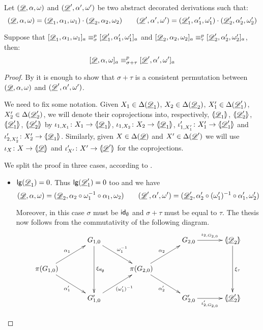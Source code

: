 \begin{lemma}\label{lem:sum} Let $(\underline{\mathscr{D}}, \alpha, \omega)$ and $(\underline{\mathscr{D}}', \alpha', \omega')$ be two abstract decorated derivations such that:
	\[(\underline{\mathscr{D}}, \alpha, \omega)=(\underline{\mathscr{D}}_1, \alpha_1, \omega_1)\cdot (\underline{\mathscr{D}}_2, \alpha_2, \omega_2) \qquad (\underline{\mathscr{D}}', \alpha', \omega')=(\underline{\mathscr{D}}'_1, \alpha'_1, \omega'_1)\cdot (\underline{\mathscr{D}}'_2, \alpha'_2, \omega'_2)\]
	
Suppose that $[\underline{\mathscr{D}}_1, \alpha_1, \omega_1]_a \equiv^p_\sigma [\underline{\mathscr{D}}'_1, \alpha'_1, \omega'_1]_a$ and $[\underline{\mathscr{D}}_2, \alpha_2, \omega_2]_a \equiv^p_\tau [\underline{\mathscr{D}}'_2, \alpha'_2, \omega'_2]_a$, then:
\[[\underline{\mathscr{D}}, \alpha, \omega]_a\equiv^p_{\sigma+\tau} [\underline{\mathscr{D}}', \alpha', \omega']_a\]
\end{lemma}
\begin{proof}
By 	it is enough to show that $\sigma+\tau$	is a consistent permutation between $(\underline{\mathscr{D}}, \alpha, \omega)$ and $(\underline{\mathscr{D}}', \alpha', \omega')$.

We need to fix some notation.	Given $X_1\in \Delta(\underline{\mathscr{D}}_1)$, $X_2\in \Delta(\underline{\mathscr{D}}_2)$, $X'_1\in \Delta(\underline{\mathscr{D}}'_1)$, $X'_2\in \Delta(\underline{\mathscr{D}}'_2)$, we will denote their coprojections into, respectively, $\langle \hspace{-1.85pt}[ \underline{\mathscr{D}}_1]\hspace{-1.85pt}\rangle$, $\langle \hspace{-1.85pt}[ \underline{\mathscr{D}}'_2]\hspace{-1.85pt}\rangle$, $\langle \hspace{-1.85pt}[ \underline{\mathscr{D}}'_1]\hspace{-1.85pt}\rangle$, $\langle \hspace{-1.85pt}[ \underline{\mathscr{D}}'_2]\hspace{-1.85pt}\rangle$ by
	$\iota_{1, X_1}\colon X_1\to \langle \hspace{-1.85pt}[\underline{\mathscr{D}}_1]\hspace{-1.85pt}\rangle$, $\iota_{1, X_2}\colon X_2\to \langle \hspace{-1.85pt}[\underline{\mathscr{D}}_1]\hspace{-1.85pt}\rangle$, $\iota'_{1, X'_1}\colon X'_1\to \langle \hspace{-1.85pt}[\underline{\mathscr{D}}'_1]\hspace{-1.85pt}\rangle$ and $\iota'_{2, X'_2}\colon X'_2\to \langle \hspace{-1.85pt}[\underline{\mathscr{D}}_1]\hspace{-1.85pt}\rangle$. Similarly, given $X\in \Delta(\underline{\mathscr{D}})$ and $X'\in \Delta(\underline{\mathscr{D}}')$ we will use $\iota_X\colon X\to \langle \hspace{-1.85pt}[ \underline{\mathscr{D}}]\hspace{-1.85pt}\rangle$ and $\iota'_{X'}\colon X'\to \langle \hspace{-1.85pt}[ \underline{\mathscr{D}}' ]\hspace{-1.85pt}\rangle$ for the coprojections. 
	
	We split the proof in three cases, according to .
	\begin{itemize}
		\item $\mathsf{lg}(\underline{\mathscr{D}}_1)=0$. Thus $\mathsf{lg}(\underline{\mathscr{D}}'_1)=0$ too  and we have
		\[
		(\underline{\mathscr{D}}, \alpha, \omega)=(\underline{\mathscr{D}}_2, \alpha_2\circ \omega_1^{-1}\circ \alpha_1, \omega_2) \qquad  (\underline{\mathscr{D}}', \alpha', \omega')=(\underline{\mathscr{D}}'_2, \alpha'_2\circ (\omega'_1)^{-1}\circ \alpha'_1, \omega'_2)\]
		
		Moreover, in this case $\sigma$ must be $\mathsf{id}_{\emptyset}$ and $\sigma+\tau$ must be equal to $\tau$. The thesis now follows from the commutativity of the following diagram.
		\[\xymatrix@C=35pt{& G_{1,0}\ar[dd]^{\xi_{\id{\emptyset}}} \ar[dr]^{\omega^{-1}_1}&&G_{2,0}\ar[r]^-{\iota_{2, G_{2,0}}} & \lpro \der{D}_2\rpro \ar[dd]^{\xi_{\tau}}\\\pi(G_{1,0})  \ar[ur]^{\alpha_1} \ar[dr]_{\alpha'_1}&& \pi(G_{2,0}) \ar[ur]^{\alpha_2} \ar[dr]_{\alpha'_2}\\& G'_{1,0} \ar[ur]_{(\omega'_1)^{-1}}&&G'_{2,0} \ar[r]_-{\iota'_{2, G_{2,0}}}& \lpro \der{D}'_2\rpro}\]
		

\end{itemize}
\end{proof}
